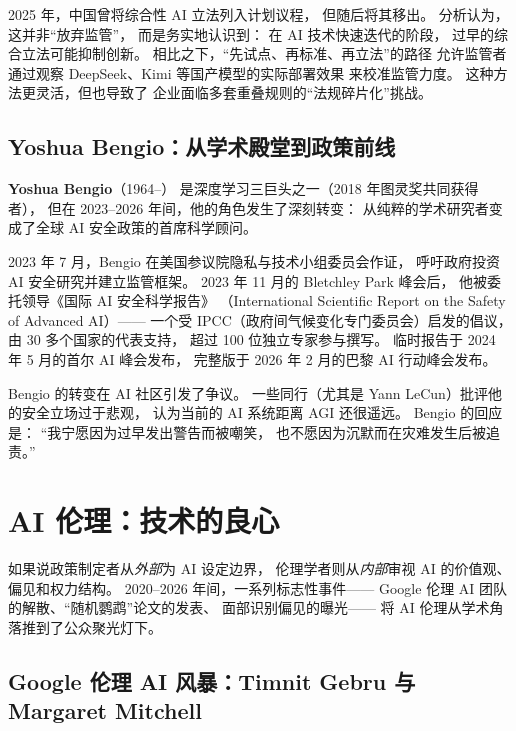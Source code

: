 \begin{whybox}[中国为什么没有出台综合性 AI 法？]
2025 年，中国曾将综合性 AI 立法列入计划议程，
但随后将其移出。
分析认为，这并非``放弃监管''，
而是务实地认识到：
在 AI 技术快速迭代的阶段，
过早的综合立法可能抑制创新。
相比之下，``先试点、再标准、再立法''的路径
允许监管者通过观察 DeepSeek、Kimi 等国产模型的实际部署效果
来校准监管力度。
这种方法更灵活，但也导致了
企业面临多套重叠规则的``法规碎片化''挑战。
\end{whybox}

\subsection{Yoshua Bengio：从学术殿堂到政策前线}

\textbf{Yoshua Bengio}（1964--）
是深度学习三巨头之一（2018 年图灵奖共同获得者），
但在 2023--2026 年间，他的角色发生了深刻转变：
从纯粹的学术研究者变成了全球 AI 安全政策的首席科学顾问。

2023 年 7 月，Bengio 在美国参议院隐私与技术小组委员会作证，
呼吁政府投资 AI 安全研究并建立监管框架。
2023 年 11 月的 Bletchley Park 峰会后，
他被委托领导《国际 AI 安全科学报告》
（International Scientific Report on the Safety of Advanced AI）——
一个受 IPCC（政府间气候变化专门委员会）启发的倡议，
由 30 多个国家的代表支持，
超过 100 位独立专家参与撰写。
临时报告于 2024 年 5 月的首尔 AI 峰会发布，
完整版于 2026 年 2 月的巴黎 AI 行动峰会发布。

Bengio 的转变在 AI 社区引发了争议。
一些同行（尤其是 Yann LeCun）批评他的安全立场过于悲观，
认为当前的 AI 系统距离 AGI 还很遥远。
Bengio 的回应是：
``我宁愿因为过早发出警告而被嘲笑，
也不愿因为沉默而在灾难发生后被追责。''

\section{AI 伦理：技术的良心}
\label{sec:ethics}

如果说政策制定者从\emph{外部}为 AI 设定边界，
伦理学者则从\emph{内部}审视 AI 的价值观、偏见和权力结构。
2020--2026 年间，一系列标志性事件——
Google 伦理 AI 团队的解散、``随机鹦鹉''论文的发表、
面部识别偏见的曝光——
将 AI 伦理从学术角落推到了公众聚光灯下。

\subsection{Google 伦理 AI 风暴：Timnit Gebru 与 Margaret Mitchell}

